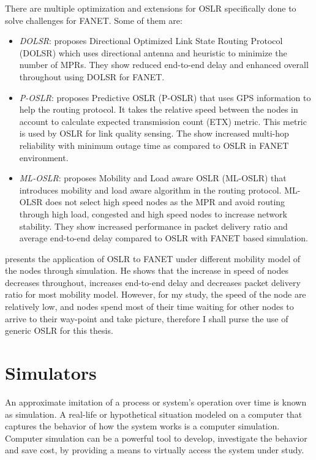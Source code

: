 There are multiple optimization and extensions for OSLR specifically done to solve challenges for FANET. Some of them are:

\begin{itemize}
	\item \textit{DOLSR}:  proposes Directional Optimized Link State Routing Protocol (DOLSR) which uses directional antenna and heuristic to minimize the number of MPRs. They show reduced end-to-end delay and enhanced overall throughout using DOLSR for FANET.
	\item \textit{P-OSLR}:  proposes Predictive OSLR (P-OSLR) that uses GPS information to help the routing protocol. It takes the relative speed between the nodes in account to calculate expected transmission count (ETX) metric. This metric is used by OSLR for link quality sensing. The show increased multi-hop reliability with minimum outage time as compared to OSLR in FANET environment.
	\item \textit{ML-OSLR}:  proposes Mobility and Load aware OSLR (ML-OSLR) that introduces mobility and load aware algorithm in the routing protocol. ML-OLSR does not select high speed nodes as the MPR and avoid routing through high load, congested and high speed nodes to increase network stability. They show increased performance in packet delivery ratio and average end-to-end delay compared to OSLR with FANET based simulation.
\end{itemize}

 presents the application of OSLR to FANET under different mobility model of the nodes through simulation. He shows that the increase in speed of nodes decreases throughout, increases end-to-end delay and decreases packet delivery ratio for most mobility model. However, for my study, the speed of the node are relatively low, and nodes spend most of their time waiting for other nodes to arrive to their way-point and take picture, therefore I shall purse the use of generic OSLR for this thesis.


\section{Simulators}

An approximate imitation of a process or system's operation over time is known as simulation. A real-life or hypothetical situation modeled on a computer that captures the behavior of how the system works is a computer simulation. Computer simulation can be a powerful tool to develop, investigate the behavior and save cost, by providing a means to virtually access the system under study.

